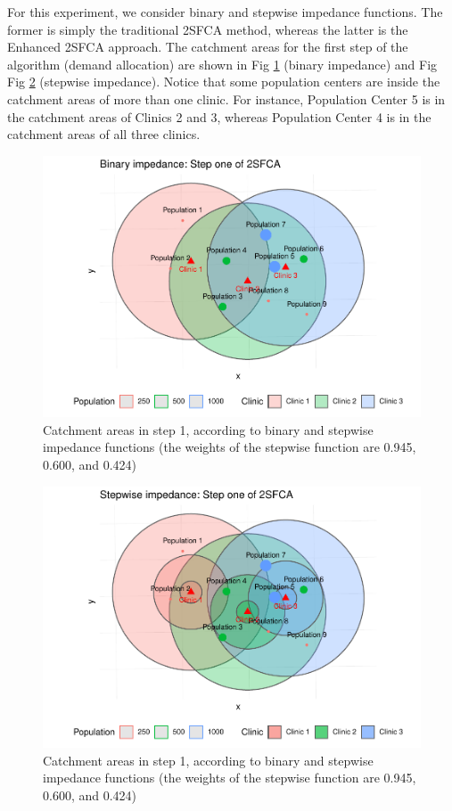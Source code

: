 \documentclass[10pt,letterpaper]{article}
\begin{document}
For this experiment, we consider binary and stepwise impedance
functions. The former is simply the traditional 2SFCA method, whereas
the latter is the Enhanced 2SFCA approach. The catchment areas for the
first step of the algorithm (demand allocation) are shown in Fig
\ref{fig:fig7a-simulation-step1} (binary impedance) and Fig Fig
\ref{fig:fig7b-simulation-step1} (stepwise impedance). Notice that some
population centers are inside the catchment areas of more than one
clinic. For instance, Population Center 5 is in the catchment areas of
Clinics 2 and 3, whereas Population Center 4 is in the catchment areas
of all three clinics.

\begin{figure}
\includegraphics[width=0.95\linewidth]{Supply_and_Demand_Inflation_in_FCA_Methods_v2.0_files/figure-latex/fig7a-simulation-step1-1} \caption{\label{fig:fig7a-simulation-step1}Catchment areas in step 1, according to binary and stepwise impedance functions (the weights of the stepwise function are 0.945, 0.600, and 0.424)}\label{fig:fig7a-simulation-step1}
\end{figure}

\begin{figure}
\includegraphics[width=0.95\linewidth]{Supply_and_Demand_Inflation_in_FCA_Methods_v2.0_files/figure-latex/fig7b-simulation-step1-1} \caption{\label{fig:fig7b-simulation-step1}Catchment areas in step 1, according to binary and stepwise impedance functions (the weights of the stepwise function are 0.945, 0.600, and 0.424)}\label{fig:fig7b-simulation-step1}
\end{figure}
\end{document}
